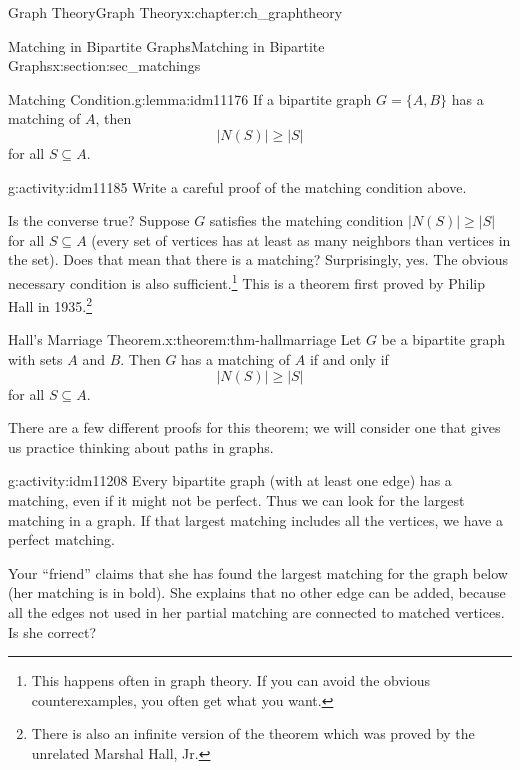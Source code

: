 \documentclass[oneside,10pt,]{book}
\numberwithin{equation}{chapter}
\begin{document}
\begin{chapterptx}{Graph Theory}{}{Graph Theory}{}{}{x:chapter:ch_graphtheory}
\begin{sectionptx}{Matching in Bipartite Graphs}{}{Matching in Bipartite Graphs}{}{}{x:section:sec_matchings}
\begin{lemma}{Matching Condition.}{}{g:lemma:idm11176}%
 If a bipartite graph \(G = \{A, B\}\) has a matching of \(A\), then%
\begin{equation*}
|N(S)| \ge |S|
\end{equation*}
for all \(S \subseteq A\).%
\end{lemma}
\begin{activity}{}{g:activity:idm11185}%
Write a careful proof of the matching condition above.%
\end{activity}
Is the converse true? Suppose \(G\) satisfies the matching condition \(|N(S)| \ge |S|\) for all \(S \subseteq A\) (every set of vertices has at least as many neighbors than vertices in the set). Does that mean that there is a matching? Surprisingly, yes. The obvious necessary condition is also sufficient.\footnote{This happens often in graph theory.  If you can avoid the obvious counterexamples, you often get what you want.\label{g:fn:idm11192}} This is a theorem first proved by Philip Hall in 1935.\footnote{There is also an infinite version of the theorem which was proved by the unrelated Marshal Hall, Jr.\label{g:fn:idm11193}}%
\begin{theorem}{Hall's Marriage Theorem.}{}{x:theorem:thm-hallmarriage}%
 Let \(G\) be a bipartite graph with sets \(A\) and \(B\). Then \(G\) has a matching of \(A\) if and only if%
\begin{equation*}
|N(S)| \ge |S|
\end{equation*}
for all \(S \subseteq A\).%
\end{theorem}
There are a few different proofs for this theorem; we will consider one that gives us practice thinking about paths in graphs.%
\begin{activity}{}{g:activity:idm11208}%
Every bipartite graph (with at least one edge) has a matching, even if it might not be perfect.  Thus we can look for the largest matching in a graph.  If that largest matching includes all the vertices, we have a perfect matching.%
\par
Your ``friend'' claims that she has found the largest matching for the graph below (her matching is in bold). She explains that no other edge can be added, because all the edges not used in her partial matching are connected to matched vertices. Is she correct?%
\begin{sidebyside}{1}{0.3}{0.3}{0}%
\begin{sbspanel}{0.4}%
\resizebox{\linewidth}{!}{%
}
\end{sbspanel}
\end{sidebyside}
\end{activity}
\end{sectionptx}
\end{chapterptx}
\end{document}
